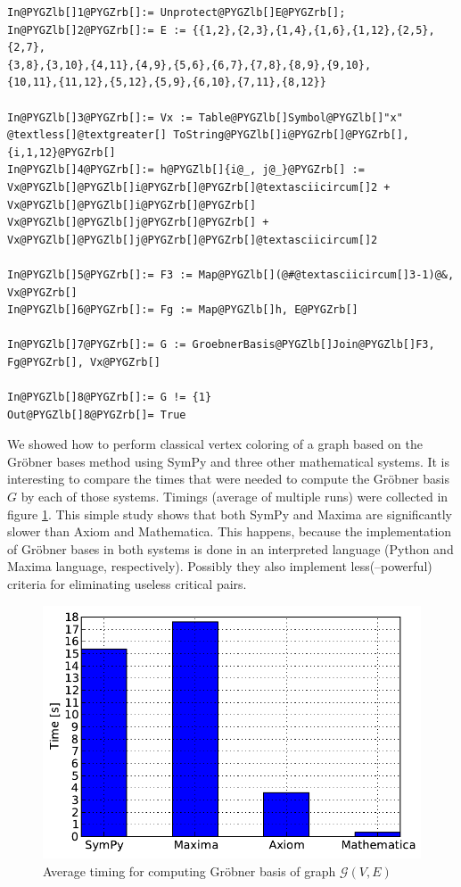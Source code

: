 \begin{Verbatim}[commandchars=@\[\]]
In@PYGZlb[]1@PYGZrb[]:= Unprotect@PYGZlb[]E@PYGZrb[];
In@PYGZlb[]2@PYGZrb[]:= E := {{1,2},{2,3},{1,4},{1,6},{1,12},{2,5},{2,7},
{3,8},{3,10},{4,11},{4,9},{5,6},{6,7},{7,8},{8,9},{9,10},
{10,11},{11,12},{5,12},{5,9},{6,10},{7,11},{8,12}}

In@PYGZlb[]3@PYGZrb[]:= Vx := Table@PYGZlb[]Symbol@PYGZlb[]"x" @textless[]@textgreater[] ToString@PYGZlb[]i@PYGZrb[]@PYGZrb[], {i,1,12}@PYGZrb[]
In@PYGZlb[]4@PYGZrb[]:= h@PYGZlb[]{i@_, j@_}@PYGZrb[] := Vx@PYGZlb[]@PYGZlb[]i@PYGZrb[]@PYGZrb[]@textasciicircum[]2 + Vx@PYGZlb[]@PYGZlb[]i@PYGZrb[]@PYGZrb[] Vx@PYGZlb[]@PYGZlb[]j@PYGZrb[]@PYGZrb[] + Vx@PYGZlb[]@PYGZlb[]j@PYGZrb[]@PYGZrb[]@textasciicircum[]2

In@PYGZlb[]5@PYGZrb[]:= F3 := Map@PYGZlb[](@#@textasciicircum[]3-1)@&, Vx@PYGZrb[]
In@PYGZlb[]6@PYGZrb[]:= Fg := Map@PYGZlb[]h, E@PYGZrb[]

In@PYGZlb[]7@PYGZrb[]:= G := GroebnerBasis@PYGZlb[]Join@PYGZlb[]F3, Fg@PYGZrb[], Vx@PYGZrb[]

In@PYGZlb[]8@PYGZrb[]:= G != {1}
Out@PYGZlb[]8@PYGZrb[]= True
\end{Verbatim}
\noindent
We showed how to perform classical vertex coloring of a graph based on the Gröbner bases method
using SymPy and three other mathematical systems. It is interesting to compare the times that were
needed to compute the Gröbner basis $G$ by each of those systems. Timings (average of multiple
runs) were collected in figure \ref{fig-groebner-time-compare}. This simple study shows that both
SymPy and Maxima are significantly slower than Axiom and Mathematica. This happens, because the
implementation of Gröbner bases in both systems is done in an interpreted language (Python and
Maxima language, respectively). Possibly they also implement less(--powerful) criteria for eliminating
useless critical pairs.
\begin{figure}[htbp]
\centering

\includegraphics{groebner-time-compare.pdf}
\caption{Average timing for computing Gröbner basis of graph $\mathcal{G}(V, E)$\label{fig-groebner-time-compare}}\end{figure}



